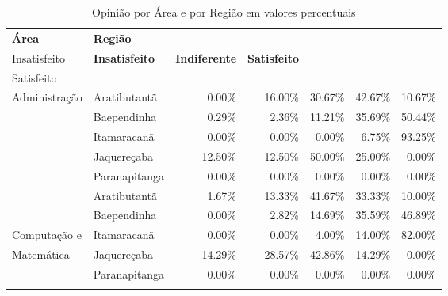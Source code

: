 \begin{table}[h]
\scriptsize
\centering
\caption{Opinião por Área e por Região em valores percentuais} 
\vspace{.5em}
\label{tabela:q15p}
\begin{tabular}{ll rrrrr}
  \toprule
 \textbf{Área} & \textbf{Região}  & \textbf{\specialcell{c}{Muito\\Insatisfeito}} & \textbf{ Insatisfeito} & \textbf{ Indiferente} & \textbf{ Satisfeito} & \textbf{\specialcell{c}{Muito\\Satisfeito}} \\ 
   \midrule
Administração             & Aratibutantã            &               0.00\% &        16.00\% &       30.67\% &      42.67\% &            10.67\% \\ 
                          & Baependinha             &               0.29\% &         2.36\% &       11.21\% &      35.69\% &            50.44\% \\ 
                          & Itamaracanã             &               0.00\% &         0.00\% &        0.00\% &       6.75\% &            93.25\% \\ 
                          & Jaquereçaba             &              12.50\% &        12.50\% &       50.00\% &      25.00\% &             0.00\% \\ 
                          & Paranapitanga           &               0.00\% &         0.00\% &        0.00\% &       0.00\% &             0.00\% \\ 
 \midrule{}
						  & Aratibutantã            &               1.67\% &        13.33\% &       41.67\% &      33.33\% &            10.00\% \\ 
                          & Baependinha             &               0.00\% &         2.82\% &       14.69\% &      35.59\% &            46.89\% \\ 
  Computação e            & Itamaracanã             &               0.00\% &         0.00\% &        4.00\% &      14.00\% &            82.00\% \\ 
  Matemática          	  & Jaquereçaba             &              14.29\% &        28.57\% &       42.86\% &      14.29\% &             0.00\% \\ 
                          & Paranapitanga           &               0.00\% &         0.00\% &        0.00\% &       0.00\% &             0.00\% \\ 
 \midrule{}                                                                                                                          

\end{tabular}
\end{table}
